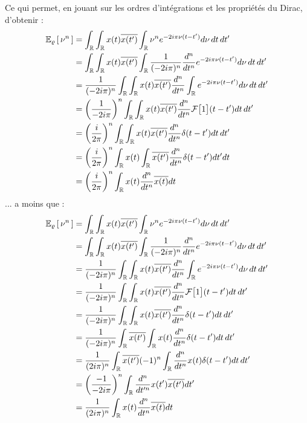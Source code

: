 \begin{proposition}
\begin{demo}
		Ce qui permet, en jouant sur les ordres d'intégrations et les propriétés du Dirac, d'obtenir :
		\begin{align*}
			\esp[\varrho]{\nu^n} &= \int_\R \int_\R x(t) \congu{x(t')} \int_\R \nu^n e^{-2i \pi \nu (t-t')} d\nu\, dt\, dt' \\
			&= \int_\R \int_\R x(t) \congu{x(t')} \int_\R \frac{1}{(-2i \pi)^n}\frac{d^n}{dt^n}e^{-2i \pi \nu(t-t')} d\nu\, dt\, dt' \\
			&= \frac{1}{(-2i \pi)^n} \int_\R \int_\R x(t) \congu{x(t')} \frac{d^n}{dt^n}\int_\R e^{-2i \pi \nu(t-t')} d\nu\, dt\, dt' \\
			&= \left(\frac{1}{-2i \pi}\right)^n \int_\R \int_\R x(t) \congu{x(t')} \frac{d^n}{dt^n}\mathcal{F}\big[1\big](t-t') dt\, dt' \\
			&= \left(\frac{i}{2 \pi}\right)^n \int_\R \int_\R x(t) \congu{x(t')} \frac{d^n}{dt^n}\delta(t-t') dt\, dt' \\
			&= \left(\frac{i}{2 \pi}\right)^n \int_\R x(t) \int_\R \congu{x(t')} \frac{d^n}{dt^n}\delta(t-t') dt' dt \\
			&= \left(\frac{i}{2 \pi}\right)^n  \int_\R x(t) \frac{d^n}{dt^n}  \congu{x(t)} dt
		\end{align*}
		... a moins que :
		\begin{align*}
			\esp[\varrho]{\nu^n} &= \int_\R \int_\R x(t) \congu{x(t')} \int_\R \nu^n e^{-2i \pi \nu (t-t')} d\nu\, dt\, dt' \\
			&= \int_\R \int_\R x(t) \congu{x(t')} \int_\R \frac{1}{(-2i \pi)^n}\frac{d^n}{dt^n}e^{-2i \pi \nu(t-t')} d\nu\, dt\, dt' \\
			&= \frac{1}{(-2i \pi)^n} \int_\R \int_\R x(t) \congu{x(t')} \frac{d^n}{dt^n}\int_\R e^{-2i \pi \nu(t-t')} d\nu\, dt\, dt' \\
			&= \frac{1}{(-2 i\pi)^n} \int_\R \int_\R x(t) \congu{x(t')} \frac{d^n}{dt^n}\mathcal{F}\big[1\big](t-t') dt\, dt' \\
			&= \frac{1}{(-2 i\pi)^n} \int_\R \int_\R x(t) \congu{x(t')} \frac{d^n}{dt^n}\delta(t-t') dt\, dt' \\
			&= \frac{1}{(-2 i\pi)^n} \int_\R \congu{x(t')} \int_\R x(t) \frac{d^n}{dt^n}\delta(t-t') dt\, dt' \\
			&= \frac{1}{(2 i\pi)^n} \int_\R \congu{x(t')}(-1)^n\int_\R \frac{d^n}{dt^n}x(t) \delta(t-t') dt\, dt' \\
			&= \left(\frac{-1}{-2i \pi}\right)^n \int_\R \frac{d^n}{dt'^n}x(t') \congu{x(t')}  dt' \\
			&= \frac{1}{(2 i\pi)^n}  \int_\R x(t) \frac{d^n}{dt^n}  \congu{x(t)} dt
		\end{align*}
	\end{demo}
\end{proposition}

